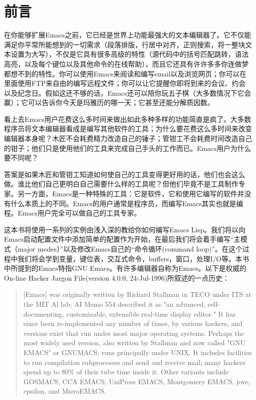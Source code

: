\chapter{前言}
\label{chapter:00-Preface}

在你能够扩展Emacs之前，它已经是世界上功能最强大的文本编辑器了。它不仅能满足你平常所能想到的一切需求（段落排版，行居中对齐，正则搜索，将一整块文本设置为大写），不仅是它具有很多高级的特性（源代码中的括号匹配跳转，语法高亮，以及每个键位以及其他命令的在线帮助），而且它还具有许许多多你连做梦都想不到的特性。你可以使用Emacs来阅读和编写email以及浏览网页；你可以在里面使用FTP来自由的编写远程文件；你可以让它提醒你即将到来的会议、约会以及纪念日。假如这还不够的话，Emacs还可以陪你玩五子棋（大多数情况下它会赢）；它可以告诉你今天是玛雅历的哪一天；它甚至还能分解质因数。

看上去Emacs用户花费这么多时间来做出如此多种多样的功能简直是疯了。大多数程序员将文本编辑器看成是编写其他软件的工具；为什么要花费这么多时间来改变编辑器本身呢？木匠不会耗费精力改造自己的锤子；管钳工不会耗费时间改造自己的钳子；他们只是使用他们的工具来完成自己手头的工作而已。Emacs用户为什么要不同呢？

答案是如果木匠和管钳工知道如何使自己的工具变得更好用的话，他们也会这么做。谁比他们自己更明白自己需要什么样的工具呢？但他们毕竟不是工具制作专家。另一方面，Emacs是一种特殊的工具：它是软件，它和使用它编写的软件并没有什么本质上的不同。Emacs的用户通常是程序员，而编写Emacs其实也就是编程。Emacs用户完全可以做自己的工具专家。

这本书将使用一系列的实例由浅入深的教给你如何编写Emacs Lisp。我们将以向Emacs启动配置文件中添加简单的配置作为开始，在最后我们将会着手编写“主模式（major modes）”以及修改Emacs自己的“命令循环(command loop)”。在这个过程中我们将会学到变量，键位表，交互式命令，buffers，窗口，处理I/O等。本书中所提到的Emacs特指GNU Emacs。有许多编辑器自称为Emacs。以下是权威的On-line Hacker Jargon File(version 4.0.0, 24-Jul-1996)所叙述的一点历史：

\begin{quotation}
[Emacs] was originally written by Richard Stallman in TECO under ITS at the MIT Al lab; AI Memo 554 described it as "an advanced, self-documenting, customizable, extensible real-time display editor." It has since been re-implemented any number of times, by various hackers, and versions exist that run under most major operating systems. Perhaps the most widely used version, also written by Stallman and now called "GNU EMACS" or GNUMACS, runs principally under UNIX. It includes facilities to run compilation subprocesses and send and receive mail; many hackers spend up to 80\% of their tube time inside it. Other variants include GOSMACS, CCA EMACS, UniPress EMACS, Montgomery EMACS, jove, epsilon, and MicroEMACS.
\end{quotation}

